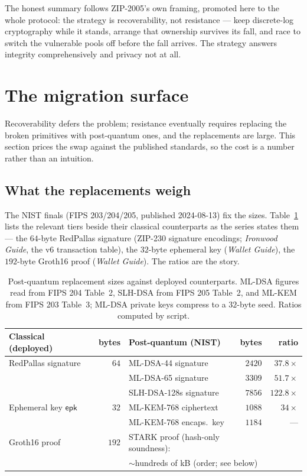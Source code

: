 \documentclass[11pt,a4paper]{article}
\theoremstyle{definition}
\begin{document}
The honest summary follows ZIP-2005's own framing, promoted here to the
whole protocol: the strategy is recoverability, not resistance --- keep
discrete-log cryptography while it stands, arrange that ownership
survives its fall, and race to switch the vulnerable pools off before
the fall arrives. The strategy answers integrity comprehensively and
privacy not at all.

\FloatBarrier

\section{The migration surface}\label{sec:pq-migration}

Recoverability defers the problem; resistance eventually requires
replacing the broken primitives with post-quantum ones, and the
replacements are large. This section prices the swap against the
published standards, so the cost is a number rather than an intuition.

\subsection{What the replacements weigh}\label{sec:pq-sizes}

The NIST finals (FIPS 203/204/205, published 2024-08-13) fix the sizes.
Table~\ref{tab:pq-nist} lists the relevant tiers beside their classical
counterparts as the series states them --- the $64$-byte RedPallas
signature (ZIP-230 signature encodings; \emph{Ironwood Guide}, the v6
transaction table), the $32$-byte ephemeral key (\emph{Wallet Guide}),
the $192$-byte Groth16 proof (\emph{Wallet Guide}). The ratios are the
story.

\begin{table}[ht]
\centering
\small
\begin{tabular}{@{}l r l r r@{}}
\toprule
Classical (deployed) & bytes & Post-quantum (NIST) & bytes & ratio \\
\midrule
RedPallas signature & $64$ & ML-DSA-44 signature & $2420$ & $37.8\times$ \\
                    &      & ML-DSA-65 signature & $3309$ & $51.7\times$ \\
                    &      & SLH-DSA-128s signature & $7856$ & $122.8\times$ \\
\addlinespace[2pt]
Ephemeral key $\mathsf{epk}$ & $32$ & ML-KEM-768 ciphertext & $1088$ & $34\times$ \\
                             &      & ML-KEM-768 encaps.\ key & $1184$ & --- \\
\addlinespace[2pt]
Groth16 proof & $192$ & \multicolumn{2}{l}{STARK proof (hash-only soundness):} & \\
              &       & \multicolumn{3}{l}{$\sim$hundreds of kB (order; see below)} \\
\bottomrule
\end{tabular}
\caption{Post-quantum replacement sizes against deployed counterparts.
ML-DSA figures read from FIPS 204 Table~2, SLH-DSA from FIPS 205
Table~2, and ML-KEM from FIPS 203 Table~3; ML-DSA private keys compress
to a $32$-byte seed. Ratios computed by script.}
\label{tab:pq-nist}
\end{table}
\end{document}
